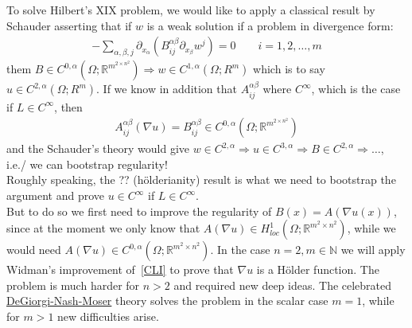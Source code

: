 To solve Hilbert's XIX problem, we would like to apply a classical result by Schauder asserting that if \( w \) is a weak solution if a problem in divergence form:
\begin{gather}
	- \sum\limits_{\alpha ,\beta ,j}^{} \partial_{x_{\alpha }} \left( B_{ij}^{\alpha \beta } \partial_{x_{\beta }} w^{j} \right) = 0\qquad i = 1,2,\ldots,m
\end{gather}
them \( B \in  C^{0, \alpha }(\Omega ; \mathbb{R}^{m^{2 \times n^{2}}}) \Rightarrow w \in C^{1, \alpha }(\Omega ; R^{m}) \) which is to say \( u \in C^{2, \alpha }(\Omega ; R^{m}) \). If we know in addition that \( A_{ij}^{\alpha \beta } \) where \( C^{\infty } \), which is the case if \( L \in  C^{\infty } \), then
\begin{gather}
	A_{ij}^{\alpha \beta }(\nabla u) = B_{ij}^{\alpha \beta } \in C^{0, \alpha }(\Omega ; \mathbb{R}^{m^{2 \times n^{2}}})
\end{gather}
and the Schauder's theory would give \( w \in C^{2, \alpha } \Rightarrow u \in C^{3, \alpha } \Rightarrow B \in C^{2, \alpha } \Rightarrow \ldots \), i.e./ we can bootstrap regularity! \\
Roughly speaking, the ?? (hölderianity) result is what we need to bootstrap the argument and prove \( u \in  C^{\infty } \) if \( L \in C^{\infty } \). \\
But to do so we first need to improve the regularity of \( B(x) = A(\nabla u(x))	\), since at the moment we only know that \( A(\nabla u ) \in H_{loc}^{1}(\Omega ; \mathbb{R}^{m^{2} \times n^{2}}) \), while we would need \( A(\nabla u ) \in C^{0, \alpha }(\Omega ; \mathbb{R}^{m^{2} \times n^{2}})  \). In the case \( n=2, m \in  \mathbb{N} \) we will apply Widman's improvement of~\eqref{CLI} to prove that \( \nabla u \) is a Hölder function. The problem is much harder for \( n >2 \) and required new deep ideas. The celebrated \underline{DeGiorgi-Nash-Moser} theory solves the problem in the scalar case \( m=1 \), while for \( m >1 \) new difficulties arise.


